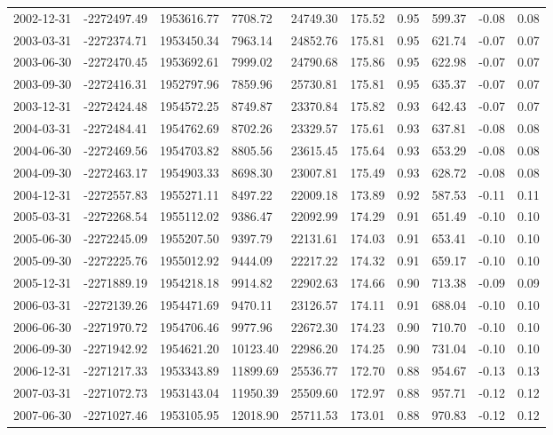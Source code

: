 \begin{landscape}
\begin{longtable}{llllllllll}
2002-12-31 & -2272497.49 & 1953616.77 & 7708.72  & 24749.30 & 175.52 & 0.95 & 599.37  & -0.08 & 0.08 \\
2003-03-31 & -2272374.71 & 1953450.34 & 7963.14  & 24852.76 & 175.81 & 0.95 & 621.74  & -0.07 & 0.07 \\
2003-06-30 & -2272470.45 & 1953692.61 & 7999.02  & 24790.68 & 175.86 & 0.95 & 622.98  & -0.07 & 0.07 \\
2003-09-30 & -2272416.31 & 1952797.96 & 7859.96  & 25730.81 & 175.81 & 0.95 & 635.37  & -0.07 & 0.07 \\
2003-12-31 & -2272424.48 & 1954572.25 & 8749.87  & 23370.84 & 175.82 & 0.93 & 642.43  & -0.07 & 0.07 \\
2004-03-31 & -2272484.41 & 1954762.69 & 8702.26  & 23329.57 & 175.61 & 0.93 & 637.81  & -0.08 & 0.08 \\
2004-06-30 & -2272469.56 & 1954703.82 & 8805.56  & 23615.45 & 175.64 & 0.93 & 653.29  & -0.08 & 0.08 \\
2004-09-30 & -2272463.17 & 1954903.33 & 8698.30  & 23007.81 & 175.49 & 0.93 & 628.72  & -0.08 & 0.08 \\
2004-12-31 & -2272557.83 & 1955271.11 & 8497.22  & 22009.18 & 173.89 & 0.92 & 587.53  & -0.11 & 0.11 \\
2005-03-31 & -2272268.54 & 1955112.02 & 9386.47  & 22092.99 & 174.29 & 0.91 & 651.49  & -0.10 & 0.10 \\
2005-06-30 & -2272245.09 & 1955207.50 & 9397.79  & 22131.61 & 174.03 & 0.91 & 653.41  & -0.10 & 0.10 \\
2005-09-30 & -2272225.76 & 1955012.92 & 9444.09  & 22217.22 & 174.32 & 0.91 & 659.17  & -0.10 & 0.10 \\
2005-12-31 & -2271889.19 & 1954218.18 & 9914.82  & 22902.63 & 174.66 & 0.90 & 713.38  & -0.09 & 0.09 \\
2006-03-31 & -2272139.26 & 1954471.69 & 9470.11  & 23126.57 & 174.11 & 0.91 & 688.04  & -0.10 & 0.10 \\
2006-06-30 & -2271970.72 & 1954706.46 & 9977.96  & 22672.30 & 174.23 & 0.90 & 710.70  & -0.10 & 0.10 \\
2006-09-30 & -2271942.92 & 1954621.20 & 10123.40 & 22986.20 & 174.25 & 0.90 & 731.04  & -0.10 & 0.10 \\
2006-12-31 & -2271217.33 & 1953343.89 & 11899.69 & 25536.77 & 172.70 & 0.88 & 954.67  & -0.13 & 0.13 \\
2007-03-31 & -2271072.73 & 1953143.04 & 11950.39 & 25509.60 & 172.97 & 0.88 & 957.71  & -0.12 & 0.12 \\
2007-06-30 & -2271027.46 & 1953105.95 & 12018.90 & 25711.53 & 173.01 & 0.88 & 970.83  & -0.12 & 0.12 \\

\end{longtable}
\end{landscape}
